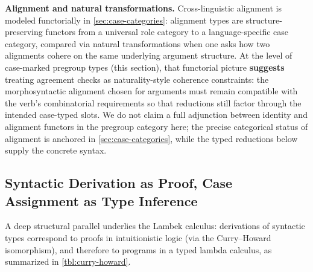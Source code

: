 \documentclass[
]{article}
\begin{document}
\textbf{Alignment and natural transformations.} Cross-linguistic
alignment is modeled functorially in \autoref{sec:case-categories}:
alignment types are structure-preserving functors from a universal role
category to a language-specific case category, compared via natural
transformations when one asks how two alignments cohere on the same
underlying argument structure. At the level of case-marked pregroup
types (this section), that functorial picture \textbf{suggests} treating
agreement checks as naturality-style coherence constraints: the
morphosyntactic alignment chosen for arguments must remain compatible
with the verb's combinatorial requirements so that reductions still
factor through the intended case-typed slots. We do not claim a full
adjunction between identity and alignment functors in the pregroup
category here; the precise categorical status of alignment is anchored
in \autoref{sec:case-categories}, while the typed reductions below
supply the concrete syntax.

\subsection{Syntactic Derivation as Proof, Case Assignment as Type
Inference}\label{syntactic-derivation-as-proof-case-assignment-as-type-inference}

A deep structural parallel underlies the Lambek calculus: derivations of
syntactic types correspond to proofs in intuitionistic logic (via the
Curry--Howard isomorphism), and therefore to programs in a typed lambda
calculus, as summarized in \autoref{tbl:curry-howard}.
\end{document}
